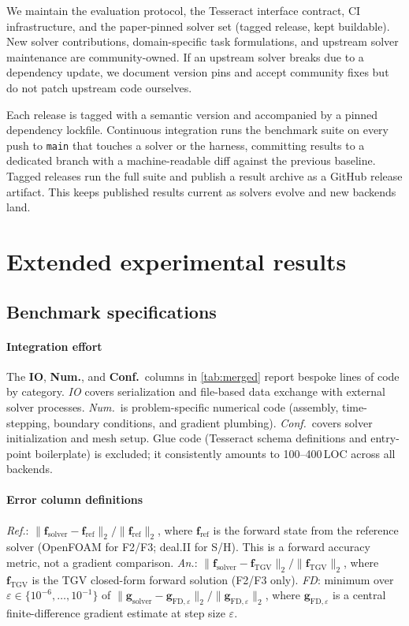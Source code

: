 \documentclass[11pt,a4paper]{article}
\begin{document}
We maintain the evaluation protocol, the Tesseract interface contract, CI
infrastructure, and the paper-pinned solver set (tagged release, kept
buildable). New solver contributions, domain-specific task formulations,
and upstream solver maintenance are community-owned. If an upstream solver
breaks due to a dependency update, we document version pins and accept
community fixes but do not patch upstream code ourselves.

Each release is tagged with a semantic version and accompanied by a pinned
dependency lockfile. Continuous integration runs the benchmark suite on
every push to
\texttt{main} that touches a solver or the harness, committing results
to a dedicated branch with a machine-readable diff against the previous
baseline. Tagged releases run the full suite and publish a result archive
as a GitHub release artifact. This keeps published results current as
solvers evolve and new backends land.

\section{Extended experimental results}
\label{app:extended}

\subsection{Benchmark specifications}
\label{app:effort}

\paragraph{Integration effort}
The \textbf{IO}, \textbf{Num.}, and \textbf{Conf.}\ columns in \cref{tab:merged}
report bespoke lines of code by category.
\emph{IO} covers serialization and file-based data exchange with external solver processes.
\emph{Num.}\ is problem-specific numerical code (assembly, time-stepping, boundary
conditions, and gradient plumbing).
\emph{Conf.}\ covers solver initialization and mesh setup.
Glue code (Tesseract schema definitions and entry-point boilerplate) is excluded; it
consistently amounts to 100--400\,LOC across all backends.

\paragraph{Error column definitions}
\textit{Ref.}: $\|\mathbf{f}_{\text{solver}} - \mathbf{f}_{\text{ref}}\|_2 / \|\mathbf{f}_{\text{ref}}\|_2$,
where $\mathbf{f}_{\text{ref}}$ is the forward state from the reference solver (OpenFOAM for F2/F3; deal.II for S/H).
This is a forward accuracy metric, not a gradient comparison.
\textit{An.}: $\|\mathbf{f}_{\text{solver}} - \mathbf{f}_{\text{TGV}}\|_2 / \|\mathbf{f}_{\text{TGV}}\|_2$,
where $\mathbf{f}_{\text{TGV}}$ is the TGV closed-form forward solution (F2/F3 only).
\textit{FD}: minimum over $\varepsilon \in \{10^{-6}, \ldots, 10^{-1}\}$ of
$\|\mathbf{g}_{\text{solver}} - \mathbf{g}_{\text{FD},\varepsilon}\|_2 / \|\mathbf{g}_{\text{FD},\varepsilon}\|_2$,
where $\mathbf{g}_{\text{FD},\varepsilon}$ is a central finite-difference gradient estimate at step size $\varepsilon$.
\end{document}
